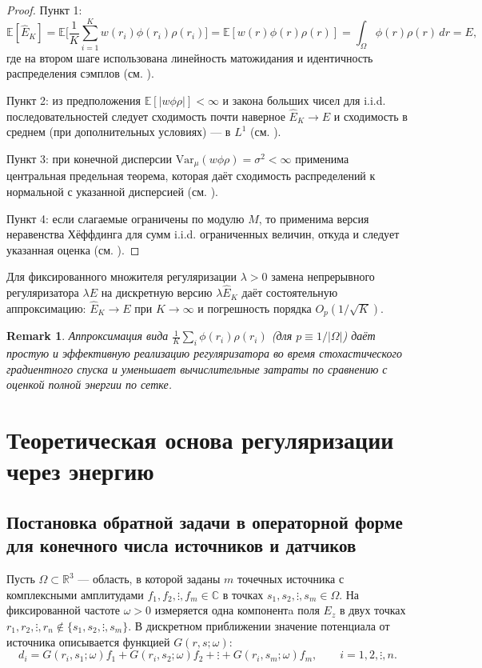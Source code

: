 \documentclass[sn-mathphys-num]{bst/sn-jnl}
\theoremstyle{thmstylethree}
\theoremstyle{thmstyletwo}
\newtheorem{remark}{Remark}
\theoremstyle{thmstyleone}
\begin{document}
\begin{proof}
Пункт 1: 
\[ \mathbb{E}[\hat E_K]=\mathbb{E}\Big[\frac{1}{K}\sum_{i=1}^K w(r_i)\phi(r_i)\rho(r_i)\Big]=\mathbb{E}[w(r)\phi(r)\rho(r)]=\int_{\Omega} \phi(r)\rho(r)\,dr=E, \]
где на втором шаге использована линейность матожидания и идентичность распределения сэмплов (см. \cite{Billingsley1995}).

Пункт 2: из предположения $\mathbb{E}[|w\phi\rho|]<\infty$ и закона больших чисел для i.i.d. последовательностей следует сходимость почти наверное $\hat E_K\to E$ и сходимость в среднем (при дополнительных условиях) --- в $L^1$ (см. \cite{Billingsley1995}).

Пункт 3: при конечной дисперсии $\mathrm{Var}_\mu(w\phi\rho)=\sigma^2<\infty$ применима центральная предельная теорема, которая даёт сходимость распределений к нормальной с указанной дисперсией (см. \cite{VanDerVaart1998}).

Пункт 4: если слагаемые ограничены по модулю $M$, то применима версия неравенства Хёффдинга для сумм i.i.d. ограниченных величин, откуда и следует указанная оценка (см. \cite{Hoeffding1963}).
\end{proof}


Для фиксированного множителя регуляризации $\lambda>0$ замена непрерывного регуляризатора $\lambda E$ на дискретную версию $\lambda\hat E_K$ даёт состоятельную аппроксимацию: $\hat E_K\to E$ при $K\to\infty$ и погрешность порядка $O_p(1/\sqrt{K})$.


\begin{remark}
Аппроксимация вида $\frac{1}{K}\sum_i\phi(r_i)\rho(r_i)$ (для $p\equiv 1/|\Omega|$) даёт простую и эффективную реализацию регуляризатора во время стохастического градиентного спуска и уменьшает вычислительные затраты по сравнению с оценкой полной энергии по сетке.
\end{remark}

\section{Теоретическая основа регуляризации через энергию}
\subsection{Постановка обратной задачи в операторной форме для конечного числа источников и датчиков}

Пусть $\Omega\subset\mathbb{R}^3$ — область, в которой заданы $m$ точечных источника с 
комплексными амплитудами $f_1,f_2, \vdots, f_m\in\mathbb{C}$ в точках $s_1,s_2, \vdots, s_m\in\Omega$. На фиксированной частоте
$\omega>0$ измеряется одна компонентa поля $E_z$ в двух точках $r_1,r_2, \vdots, r_n \notin\{s_1,s_2, \vdots, s_m\}$.
В дискретном приближении значение потенциала от источника описывается функцией $G(r,s;\omega)$:
\begin{equation}\label{eq:direct_em}
    d_i = G(r_i,s_1;\omega) f_1 + G(r_i,s_2;\omega) f_2 + \vdots + G(r_i,s_m;\omega) f_m,
    \qquad i=1,2, \vdots, n.
\end{equation}
\end{document}
